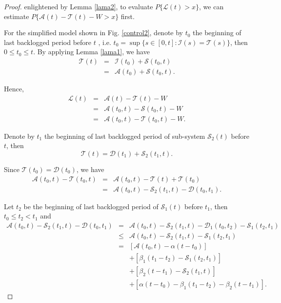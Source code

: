 \documentclass[12pt]{article}
\newtheorem{proof}{Proof}
\begin{document}
\begin{proof}
enlightened by Lemma \ref{lama2}, to evaluate $P\{\mathcal{L}(t)>x\}$, we can estimate $P\{\mathcal{A}(t)-\mathcal{T}(t)-W>x\}$ first.

For the simplified model shown in Fig. \ref{control2}, denote by $t_{0}$ the beginning of last backlogged period before $t$ \cite{Fidl06}, i.e. $t_0=\sup\{s\in[0,t]:\mathcal{I}(s)=\mathcal{T}(s)\}$, then $0\leq t_{0}\leq t$. By applying Lemma \ref{lama1}, we have
\begin{eqnarray*}
  \mathcal{T}(t)&=&\mathcal{I}(t_{0})+\mathcal{S}(t_{0},t)\\
  &=& \mathcal{A}(t_{0})+\mathcal{S}(t_{0},t).
\end{eqnarray*}

Hence,
\begin{eqnarray}
\mathcal{L}(t)&=&\mathcal{A}(t)-\mathcal{T}(t)-W\nonumber\\
&=&\mathcal{A}(t_0,t)-\mathcal{S}(t_0,t)-W\label{used4theorem5}\\
&=&\mathcal{A}(t_0,t)-\mathcal{T}(t_0,t)-W\nonumber.
\end{eqnarray}

Denote by $t_1$ the beginning of last backlogged period of sub-system $\mathcal{S}_2(t)$ before $t$, then
$$\mathcal{T}(t)=\mathcal{D}(t_1)+\mathcal{S}_2(t_1,t).$$

Since $\mathcal{T}(t_0)=\mathcal{D}(t_0)$, we have
\begin{eqnarray}
\mathcal{A}(t_0,t)-\mathcal{T}(t_0,t) &=& \mathcal{A}(t_0,t)-\mathcal{T}(t)+\mathcal{T}(t_0)\nonumber\\
&=& \mathcal{A}(t_0,t)-\mathcal{S}_2(t_1,t)-\mathcal{D}(t_0,t_1).\label{start}
\end{eqnarray}

Let $t_2$ be the beginning of last backlogged period of $\mathcal{S}_1(t)$ before $t_1$, then $t_0\leq t_2< t_1$ and
\begin{eqnarray}
\mathcal{A}(t_0,t)-\mathcal{S}_2(t_1,t)-\mathcal{D}(t_0,t_1) &=& \mathcal{A}(t_0,t)-\mathcal{S}_2(t_1,t)-\mathcal{D}_1(t_0,t_2)-\mathcal{S}_1(t_2,t_1)\nonumber\\
&\leq& \mathcal{A}(t_0,t)-\mathcal{S}_2(t_1,t)-\mathcal{S}_1(t_2,t_1)\label{used4effec}\\
&=& [\mathcal{A}(t_0,t)-\alpha(t-t_0)]\nonumber\\
&& +[\beta_1(t_1-t_2)-\mathcal{S}_1(t_2,t_1)]\nonumber\\
&& +[\beta_2(t-t_1)-\mathcal{S}_2(t_1,t)]\nonumber\\
&& +[\alpha(t-t_0)-\beta_1(t_1-t_2)-\beta_2(t-t_1)].\label{initial}
\end{eqnarray}


\end{proof}
\end{document}
